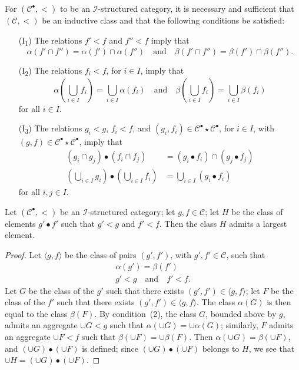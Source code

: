 \documentclass[a4paper,fleqn]{article}
\theoremstyle{plain}
\newenvironment{proposition}[1]
  {\renewcommand\theinnerproposition{#1}\innerproposition}
  {\endinnerproposition}
\theoremstyle{definition}
\newcommand{\oldpage}[1]{{\marginpar{\footnotesize$\bigg\vert$\,\,\,\,\textit{p.~#1}}}}
\newcommand{\textand}{\quad\text{and}\quad}
\newcommand{\CC}{\mathcal{C}}
\newcommand{\II}{\mathcal{I}}
\newcommand{\smallbullet}{\bullet}
\begin{document}
\oldpage{404}
For $(\CC^\smallbullet,<)$ to be an $\II$-structured category, it is necessary and sufficient that $(\CC,<)$ be an inductive class and that the following conditions be satisfied:
\begin{enumerate}
  \item[\normalfont(I\textsubscript{1})]
    The relations $f'<f$ and $f''<f$ imply that
    \[
      \alpha(f'\cap f'') = \alpha(f')\cap\alpha(f'')
      \textand
      \beta(f'\cap f'') = \beta(f')\cap\beta(f'').
    \]
  \item[\normalfont(I\textsubscript{2})]
    The relations $f_i<f$, for $i\in I$, imply that
    \[
      \alpha\left(\bigcup_{i\in I}f_i\right)
      = \bigcup_{i\in I}\alpha(f_i)
      \textand
      \beta\left(\bigcup_{i\in I}f_i\right)
      = \bigcup_{i\in I}\beta(f_i)
    \]
    for all $i\in I$.
  \item[\normalfont(I\textsubscript{3})]
    The relations $g_i<g$, $f_i<f$, and $(g_i,f_i)\in\CC^\smallbullet\star\CC^\smallbullet$, for $i\in I$, with $(g,f)\in\CC^\smallbullet\star\CC^\smallbullet$, imply that
    \[
      \begin{aligned}
        (g_i\cap g_j)\smallbullet(f_i\cap f_j)
        &= (g_i\smallbullet f_i)\cap(g_j\smallbullet f_j)
      \\\left(\bigcup_{i\in I}g_i\right)\smallbullet\left(\bigcup_{i\in I}f_i\right)
        &= \bigcup_{i\in I}(g_i\smallbullet f_i)
      \end{aligned}
    \]
    for all $i,j\in I$.
\end{enumerate}

\begin{proposition}{22}
\label{proposition:ii-22}
  Let $(\CC^\smallbullet,<)$ be an $\II$-structured category;
  let $g,f\in\CC$;
  let $H$ be the class of elements $g'\smallbullet f'$ such that $g'<g$ and $f'<f$.
  Then the class $H$ admits a largest element.
\end{proposition}

\begin{proof}
  Let $\langle{g,f}\rangle$ be the class of pairs $(g',f')$, with $g',f'\in\CC$, such that
  \[
    \begin{gathered}
      \alpha(g')=\beta(f')
    \\g'<g
      \textand
      f'<f.
    \end{gathered}
  \]
  Let $G$ be the class of the $g'$ such that there exists $(g',f')\in\langle{g,f}\rangle$;
  let $F$ be the class of the $f'$ such that there exists $(g',f')\in\langle{g,f}\rangle$.
  The class $\alpha(G)$ is then equal to the class $\beta(F)$.
  By condition~(2), the class $G$, bounded above by $g$, admits an aggregate $\cup G<g$ such that $\alpha(\cup G)=\cup\alpha(G)$;
  similarly, $F$ admits an aggregate $\cup F<f$ such that $\beta(\cup F)=\cup\beta(F)$.
  Then $\alpha(\cup G)=\beta(\cup F)$, and $(\cup G)\smallbullet(\cup F)$ is defined;
  since $(\cup G)\smallbullet(\cup F)$ belongs to $H$, we see that $\cup H=(\cup G)\smallbullet(\cup F)$.
\end{proof}
\end{document}
